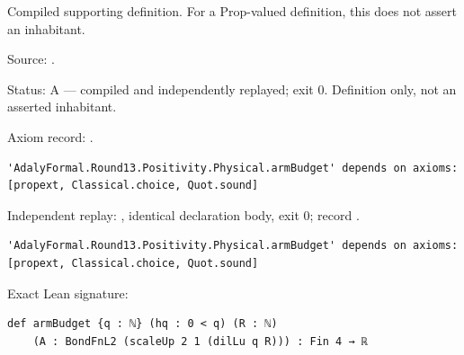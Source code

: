 \begin{definition}[bp-490]
\label{bp-490}
\uses{}
\leanok
Compiled supporting definition. For a Prop-valued definition, this does not assert an inhabitant.

\par Source: \texttt{}.
\par Status: A — compiled and independently replayed; exit 0. Definition only, not an asserted inhabitant.
\par Axiom record: \texttt{}.
\begin{verbatim}
'AdalyFormal.Round13.Positivity.Physical.armBudget' depends on axioms: [propext, Classical.choice, Quot.sound]
\end{verbatim}
\par Independent replay: \texttt{}, identical declaration body, exit 0; record \texttt{}.
\begin{verbatim}
'AdalyFormal.Round13.Positivity.Physical.armBudget' depends on axioms: [propext, Classical.choice, Quot.sound]
\end{verbatim}
\par Exact Lean signature:
\begin{verbatim}
def armBudget {q : ℕ} (hq : 0 < q) (R : ℕ)
    (A : BondFnL2 (scaleUp 2 1 (dilLu q R))) : Fin 4 → ℝ
\end{verbatim}
\end{definition}

